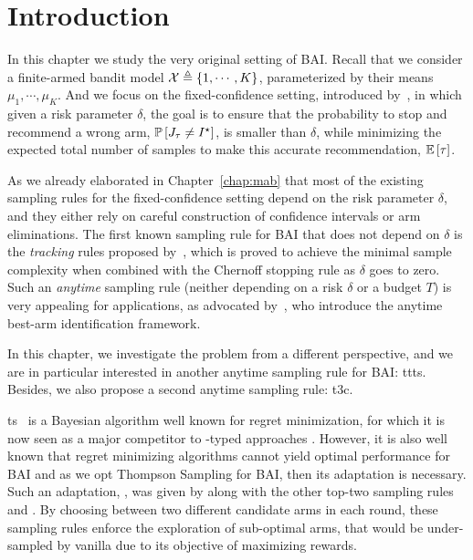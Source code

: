 \section{Introduction}\label{sec:t3c.intro}

In this chapter we study the very original setting of BAI. Recall that we consider a finite-armed bandit model $\mathcal{X}\triangleq\{1,\cdots,K\}$, parameterized by their means $\mu_1, \cdots, \mu_K$. And we focus on the fixed-confidence setting, introduced by~\cite{even-dar2003confidence}, in which given a risk parameter $\delta$, the goal is to ensure that the probability to stop and recommend a wrong arm, $\mathbb{P}\left[J_\tau \neq I^\star\right]$, is smaller than $\delta$, while minimizing the expected total number of samples to make this accurate recommendation, $\mathbb{E}\left[\tau\right]$. 


As we already elaborated in Chapter~\ref{chap:mab} that most of the existing sampling rules for the fixed-confidence setting depend on the risk parameter $\delta$, and they either rely on careful construction of confidence intervals or arm eliminations. The first known sampling rule for BAI that does not depend on $\delta$ is the \emph{tracking} rules proposed by~\cite{garivier2016tracknstop}, which is proved to achieve the minimal sample complexity when combined with the Chernoff stopping rule as $\delta$ goes to zero. Such an \emph{anytime} sampling rule (neither depending on a risk $\delta$ or a budget $T$) is very appealing for applications, as advocated by~\cite{jun2016atlucb}, who introduce the anytime best-arm identification framework. 

In this chapter, we investigate the problem from a different perspective, and we are in particular interested in another anytime sampling rule for BAI: \gls{ttts}. Besides, we also propose a second anytime sampling rule: \gls{t3c}.


\gls{ts}~\citep{thompson1933} is a Bayesian algorithm well known for regret minimization, for which it is now seen as a major competitor to \UCB-typed approaches \citep{burnetas1996optimal,auer2002ucb,cappe2013klucb}. However, it is also well known that regret minimizing algorithms cannot yield optimal performance for BAI \citep{bubeck2011pure,kaufmann2017survey} and as we opt Thompson Sampling for BAI, then its adaptation is necessary. Such an adaptation, \TTTS, was given by \citet{russo2016ttts} along with the other top-two sampling rules \TTPS and \TTVS. By choosing between two different candidate arms in each round, these sampling rules enforce the exploration of sub-optimal arms, that would be under-sampled by vanilla \TS due to its objective of maximizing rewards.

